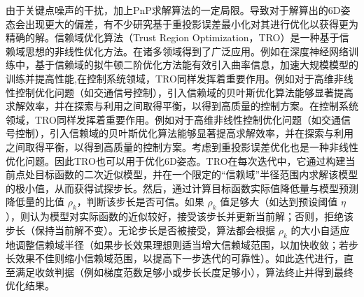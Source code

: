 由于关键点噪声的干扰，加上PnP求解算法的一定局限。导致对于解算出的6D姿态会出现更大的偏差，有不少研究基于重投影误差最小化对其进行优化以获得更为精确的解\cite{10297555,guo2024joint}。信赖域优化算法（Trust Region Optimization，TRO）是一种基于信赖域思想的非线性优化方法。在诸多领域得到了广泛应用。例如在深度神经网络训练中，基于信赖域的拟牛顿二阶优化方法能有效引入曲率信息，加速大规模模型的训练并提高性能​
\cite{a16100490},在控制系统领域，TRO同样发挥着重要作用。例如对于高维非线性控制优化问题（如交通信号控制），引入信赖域的贝叶斯优化算法能够显著提高求解效率，并在探索与利用之间取得平衡，以得到高质量的控制方案​
\cite{gong2024optimizing}
。在控制系统领域，TRO同样发挥着重要作用。例如对于高维非线性控制优化问题（如交通信号控制），引入信赖域的贝叶斯优化算法能够显著提高求解效率，并在探索与利用之间取得平衡，以得到高质量的控制方案​
\cite{2024_Gong}。考虑到重投影误差优化也是一种非线性优化问题。因此TRO也可以用于优化6D姿态。TRO在每次迭代中，它通过构建当前点处目标函数的二次近似模型，并在一个限定的“信赖域”半径范围内求解该模型的极小值，从而获得试探步长。然后，通过计算目标函数实际值降低量与模型预测降低量的比值 $\rho_k$，判断该步长是否可信。如果 $\rho_k$ 值足够大（如达到预设阈值 $\eta$），则认为模型对实际函数的近似较好，接受该步长并更新当前解；否则，拒绝该步长（保持当前解不变）。无论步长是否被接受，算法都会根据 $\rho_k$ 的大小自适应地调整信赖域半径（如果步长效果理想则适当增大信赖域范围，以加快收敛；若步长效果不佳则缩小信赖域范围，以提高下一步迭代的可靠性）。如此迭代进行，直至满足收敛判据（例如梯度范数足够小或步长长度足够小），算法终止并得到最终优化结果。


